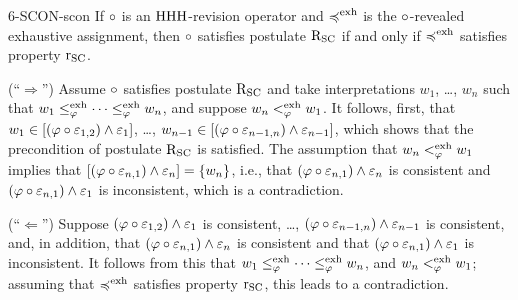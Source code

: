 \begin{thm}{}{6-SCON-scon}
	If $\circ$ is an ${\mathrm{HHH}}$-revision operator 
	and $\preccurlyeq^{{\operatorname{exh}}}$ is the $\circ$-revealed exhaustive assignment, then
	$\circ$ satisfies postulate $\mathrm{R}_{{\mathrm{SC}}}$
	if and only if 
	$\preccurlyeq^{{\operatorname{exh}}}$ satisfies property $\mathrm{r}_{{\mathrm{SC}}}$.
\end{thm}
\begin{prf*}{}{}%
	(``$\Rightarrow$'')
	Assume $\circ$ satisfies postulate $\mathrm{R}_{{\mathrm{SC}}}$ and 
	take interpretations $w_1$, \dots, $w_n$
	such that $w_1 \le^{{\operatorname{exh}}}_{\varphi}\dots \le^{{\operatorname{exh}}}_{\varphi} w_n$,
	and suppose $w_n<^{{\operatorname{exh}}}_{\varphi}w_1$.
	It follows, first, that $w_1\in[(\varphi\circ\varepsilon_{1,2})\land\varepsilon_{1}]$,
	\dots, $w_{n-1}\in[(\varphi\circ\varepsilon_{n-1,n})\land\varepsilon_{n-1}]$,
	which shows that the precondition of postulate $\mathrm{R}_{{\mathrm{SC}}}$
	is satisfied.
	The assumption that $w_n<^{{\operatorname{exh}}}_{\varphi}w_1$ implies that 
	$[(\varphi\circ\varepsilon_{n,1})\land\varepsilon_{n}]=\{w_n\}$,
	i.e., that 
	$(\varphi\circ\varepsilon_{n,1})\land\varepsilon_{n}$ is consistent
	and $(\varphi\circ\varepsilon_{n,1})\land\varepsilon_{1}$ is inconsistent,
	which is a contradiction.

	(``$\Leftarrow$'')
	Suppose $(\varphi\circ\varepsilon_{1,2})\land\varepsilon_{1}$ is consistent,
	\dots, 
	$(\varphi\circ\varepsilon_{n-1,n})\land\varepsilon_{n-1}$ is consistent,
	and, in addition, that 
	$(\varphi\circ\varepsilon_{n,1})\land\varepsilon_{n}$ is consistent
	and that $(\varphi\circ\varepsilon_{n,1})\land\varepsilon_{1}$ is inconsistent.
	It follows from this that 
	$w_1 \le^{{\operatorname{exh}}}_{\varphi}\dots\le^{{\operatorname{exh}}}_{\varphi} w_n$, and $w_n <^{{\operatorname{exh}}}_{\varphi} w_1$;
	assuming that $\preccurlyeq^{{\operatorname{exh}}}$ satisfies property $\mathrm{r}_{{\mathrm{SC}}}$,
	this leads to a contradiction.
\end{prf*}


